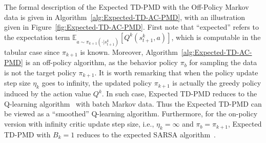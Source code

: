 \documentclass[10pt]{article}
\newcommand{\E}{\mathbb{E}}
\newcommand{\ls}{\left}
\newcommand{\rs}{\right}
\theoremstyle{plain}
\theoremstyle{definition}
\begin{document}
The formal description of the Expected TD-PMD  with the Off-Policy Markov data is given in Algorithm~\ref{alg:Expected-TD-AC-PMD}, with an illustration given in Figure~\ref{fig:Expected-TD-AC-PMD}.
First note that  ``expected'' refers to the expectation term $\E_{a\sim\pi_{k+1}(\cdot|s_{t+1}^k)} \ls[Q^k(s_{t+1}^k, a)\rs]$, which is computable in the tabular case since $\pi_{k+1}$ is known. Moreover, Algorithm~\ref{alg:Expected-TD-AC-PMD} is an off-policy algorithm, as the behavior policy $\pi_b$ for sampling the data is not the target policy $\pi_{k+1}$. It is worth remarking that when the policy update step size $\eta_k$ goes to infinity, the updated policy $\pi_{k+1}$ is actually the greedy policy induced by the action value $Q^k$. In such case, Expected TD-PMD reduces to the  Q-learning algorithm~\citep{suttonRL} with batch Markov data. Thus the Expected TD-PMD can be viewed as a ``smoothed'' Q-learning algorithm. Furthermore, for the on-policy version with infinity critic update step size, i.e., $\eta_k = \infty$ and $\pi_b = \pi_{k+1}$, Expected TD-PMD with $B_k=1$ reduces to the expected SARSA algorithm~\citep{suttonRL}. 
\end{document}
